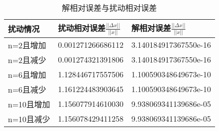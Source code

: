 \documentclass[a4paper,12pt]{ctexart}
\begin{document}
\begin{table}[H]
    \centering
    \caption{解相对误差与扰动相对误差}
    \begin{tabular}{lll}
        \hline
        扰动情况   & 扰动相对误差$\frac{||\Delta x||}{||x||}$ & 解相对误差$\frac{||\Delta x||}{||x||}$ \\ \hline
        n=2且增加  & 0.001271266686112                        & 3.140184917367550e-16                  \\
        n=2且减少  & 0.001274321391806                        & 3.140184917367550e-16                  \\
        n=6且增加  & 1.128446717557506                        & 1.100590348649673e-10                  \\
        n=6且减少  & 1.161224483903645                        & 1.100590348649673e-10                  \\
        n=10且增加 & 1.156077914610030                        & 9.938069341139686e-05                  \\
        n=10且减少 & 1.156078429411258                        & 9.938069341139686e-05                  \\
        \hline
    \end{tabular}
\end{table}

\end{document}
